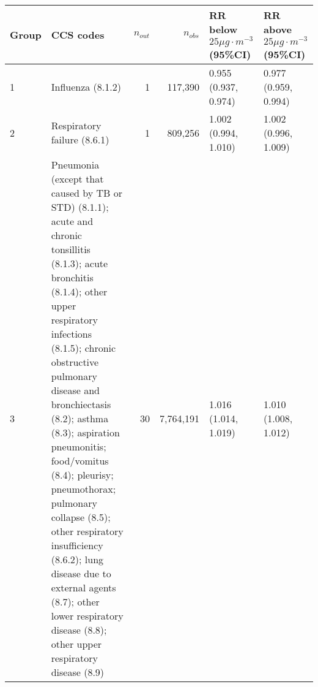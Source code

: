 \begin{tabular}{lp{6.5cm}rrp{2.2cm}p{2.2cm}}
  \hline
Group & CCS codes & $n_{out}$ & $n_{obs}$ & RR below $25 \mu g \cdot m^{-3}$ (95\%CI) & RR above $25 \mu g \cdot m^{-3}$ (95\%CI) \\ 
  \hline
   1 & Influenza (8.1.2) &    1 & 117,390 & 0.955 (0.937, 0.974) & 0.977 (0.959, 0.994) \\ 
     2 & Respiratory failure (8.6.1) &    1 & 809,256 & 1.002 (0.994, 1.010) & 1.002 (0.996, 1.009) \\ 
     3 & Pneumonia (except that caused by TB or STD) (8.1.1); acute and chronic tonsillitis (8.1.3); acute bronchitis (8.1.4); other upper respiratory infections (8.1.5); chronic obstructive pulmonary disease and bronchiectasis (8.2); asthma (8.3); aspiration pneumonitis; food/vomitus (8.4); pleurisy; pneumothorax; pulmonary collapse (8.5); other respiratory insufficiency (8.6.2); lung disease due to external agents (8.7); other lower respiratory disease (8.8); other upper respiratory disease (8.9) &   30 & 7,764,191 & 1.016 (1.014, 1.019) & 1.010 (1.008, 1.012) \\ 
   \hline
\end{tabular}

